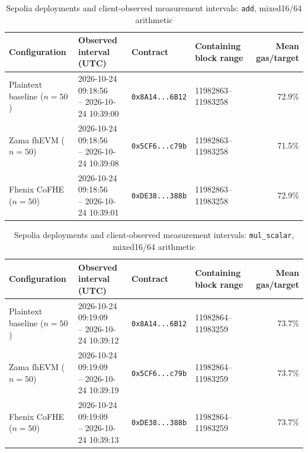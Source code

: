 \begin{table}[!t]
\caption{Sepolia deployments and client-observed measurement intervals: \texttt{add}, mixed16/64 arithmetic}
\label{tab:sepolia-client-intervals-reference-mixed-oct24-add}
\centering
\footnotesize
\setlength{\tabcolsep}{4pt}
\begin{tabular}{|l|l|l|l|r|}
\hline
\textbf{Configuration} &
\textbf{Observed interval (UTC)} &
\textbf{Contract} &
\textbf{Containing block range} &
\textbf{Mean gas/target} \\
\hline
Plaintext baseline (\(n=50\)) &
\shortstack[l]{2026-10-24 09:18:56 \\ -- 2026-10-24 10:39:00} &
\texttt{0x8A14...6B12} &
11982863--11983258 &
72.9\% \\
\hline
Zama fhEVM (\(n=50\)) &
\shortstack[l]{2026-10-24 09:18:56 \\ -- 2026-10-24 10:39:08} &
\texttt{0x5CF6...c79b} &
11982863--11983258 &
71.5\% \\
\hline
Fhenix CoFHE (\(n=50\)) &
\shortstack[l]{2026-10-24 09:18:56 \\ -- 2026-10-24 10:39:01} &
\texttt{0xDE38...388b} &
11982863--11983258 &
72.9\% \\
\hline
\end{tabular}
\end{table}

\begin{table}[!t]
\caption{Sepolia deployments and client-observed measurement intervals: \texttt{mul\_scalar}, mixed16/64 arithmetic}
\label{tab:sepolia-client-intervals-reference-mixed-oct24-mul-scalar}
\centering
\footnotesize
\setlength{\tabcolsep}{4pt}
\begin{tabular}{|l|l|l|l|r|}
\hline
\textbf{Configuration} &
\textbf{Observed interval (UTC)} &
\textbf{Contract} &
\textbf{Containing block range} &
\textbf{Mean gas/target} \\
\hline
Plaintext baseline (\(n=50\)) &
\shortstack[l]{2026-10-24 09:19:09 \\ -- 2026-10-24 10:39:12} &
\texttt{0x8A14...6B12} &
11982864--11983259 &
73.7\% \\
\hline
Zama fhEVM (\(n=50\)) &
\shortstack[l]{2026-10-24 09:19:09 \\ -- 2026-10-24 10:39:19} &
\texttt{0x5CF6...c79b} &
11982864--11983259 &
73.7\% \\
\hline
Fhenix CoFHE (\(n=50\)) &
\shortstack[l]{2026-10-24 09:19:09 \\ -- 2026-10-24 10:39:13} &
\texttt{0xDE38...388b} &
11982864--11983259 &
73.7\% \\
\hline
\end{tabular}
\end{table}

